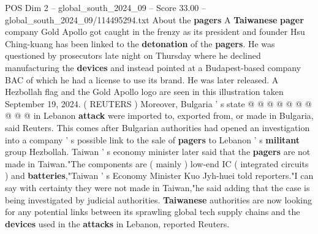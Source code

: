 \begin{textsample}{POS Dim 2 – global\_south\_2024\_09 – Score 33.00 – global\_south\_2024\_09/114495294.txt}
About the \textbf{pagers} A \textbf{Taiwanese} \textbf{pager} company Gold Apollo got caught in the frenzy as its president and founder Hsu Ching-kuang has been linked to the \textbf{detonation} of the \textbf{pagers}.
He was questioned by prosecutors late night on Thursday where he declined manufacturing the \textbf{devices} and instead pointed at a Budapest-based company BAC of which he had a license to use its brand.
He was later released.
A Hezbollah flag and the Gold Apollo logo are seen in this illustration taken September 19, 2024. ( REUTERS ) Moreover, Bulgaria ' s state @ @ @ @ @ @ @ @ @ @ in Lebanon \textbf{attack} were imported to, exported from, or made in Bulgaria, said Reuters.
This comes after Bulgarian authorities had opened an investigation into a company ' s possible link to the sale of \textbf{pagers} to Lebanon ' s \textbf{militant} group Hezbollah.
Taiwan ' s economy minister later said that the \textbf{pagers} are not made in Taiwan."The components are ( mainly ) low-end IC ( integrated circuits ) and \textbf{batteries},"Taiwan ' s Economy Minister Kuo Jyh-huei told reporters."I can say with certainty they were not made in Taiwan,"he said adding that the case is being investigated by judicial authorities. \textbf{Taiwanese} authorities are now looking for any potential links between its sprawling global tech supply chains and the \textbf{devices} used in the \textbf{attacks} in Lebanon, reported Reuters.

\end{textsample}
